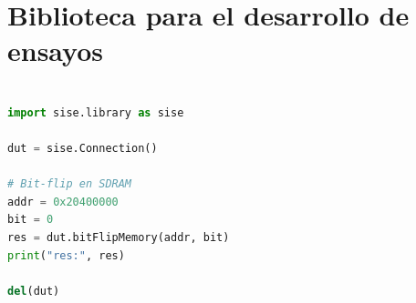 \section{Biblioteca para el desarrollo de ensayos}
\label{fig:biblioteca}

\begin{lstlisting}[language=Python,label=cod:vControl,caption=Ejemplo de aplicación de la biblioteca.]  % Start your code-block

import sise.library as sise

dut = sise.Connection()

# Bit-flip en SDRAM
addr = 0x20400000
bit = 0
res = dut.bitFlipMemory(addr, bit)
print("res:", res)

del(dut)

\end{lstlisting}
